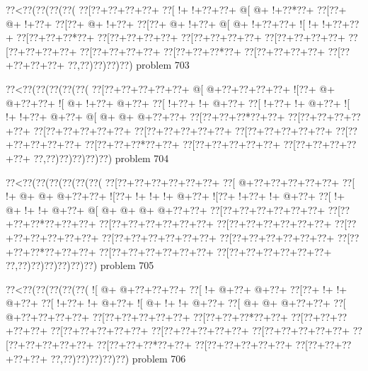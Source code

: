 \vbox{\vbox{\goo
\0??<\0??(\0??(\0??(\0??(
\0??[\0??+\0??+\0??+\0??+
\0??[\- !+\- !+\0??+\0??+
\- @[\- @+\- !+\0??*\0??+
\0??[\0??+\- @+\- !+\0??+
\0??[\0??+\- @+\- !+\0??+
\0??[\0??+\- @+\- !+\0??+
\- @[\- @+\- !+\0??+\0??+
\- ![\- !+\- !+\0??+\0??+
\0??[\0??+\0??+\0??*\0??+
\0??[\0??+\0??+\0??+\0??+
\0??[\0??+\0??+\0??+\0??+
\0??[\0??+\0??+\0??+\0??+
\0??[\0??+\0??+\0??+\0??+
\0??[\0??+\0??+\0??+\0??+
\0??[\0??+\0??+\0??*\0??+
\0??[\0??+\0??+\0??+\0??+
\0??[\0??+\0??+\0??+\0??+
\0??,\0??)\0??)\0??)\0??)
}
\hfil problem 703\hfil\break
}

\vbox{\vbox{\goo
\0??<\0??(\0??(\0??(\0??(\0??(
\0??[\0??+\0??+\0??+\0??+\0??+
\- @[\- @+\0??+\0??+\0??+\0??+
\- ![\0??+\- @+\- @+\0??+\0??+
\- ![\- @+\- !+\0??+\- @+\0??+
\0??[\- !+\0??+\- !+\- @+\0??+
\0??[\- !+\0??+\- !+\- @+\0??+
\- ![\- !+\- !+\0??+\- @+\0??+
\- @[\- @+\- @+\- @+\0??+\0??+
\0??[\0??+\0??+\0??*\0??+\0??+
\0??[\0??+\0??+\0??+\0??+\0??+
\0??[\0??+\0??+\0??+\0??+\0??+
\0??[\0??+\0??+\0??+\0??+\0??+
\0??[\0??+\0??+\0??+\0??+\0??+
\0??[\0??+\0??+\0??+\0??+\0??+
\0??[\0??+\0??+\0??*\0??+\0??+
\0??[\0??+\0??+\0??+\0??+\0??+
\0??[\0??+\0??+\0??+\0??+\0??+
\0??,\0??)\0??)\0??)\0??)\0??)
}
\hfil problem 704\hfil\break
}

\vbox{\vbox{\goo
\0??<\0??(\0??(\0??(\0??(\0??(\0??(
\0??[\0??+\0??+\0??+\0??+\0??+\0??+
\0??[\- @+\0??+\0??+\0??+\0??+\0??+
\0??[\- !+\- @+\- @+\- @+\0??+\0??+
\- ![\0??+\- !+\- !+\- !+\- @+\0??+
\- ![\0??+\- !+\0??+\- !+\- @+\0??+
\0??[\- !+\- @+\- !+\- !+\- @+\0??+
\- @[\- @+\- @+\- @+\- @+\0??+\0??+
\0??[\0??+\0??+\0??+\0??+\0??+\0??+
\0??[\0??+\0??+\0??*\0??+\0??+\0??+
\0??[\0??+\0??+\0??+\0??+\0??+\0??+
\0??[\0??+\0??+\0??+\0??+\0??+\0??+
\0??[\0??+\0??+\0??+\0??+\0??+\0??+
\0??[\0??+\0??+\0??+\0??+\0??+\0??+
\0??[\0??+\0??+\0??+\0??+\0??+\0??+
\0??[\0??+\0??+\0??*\0??+\0??+\0??+
\0??[\0??+\0??+\0??+\0??+\0??+\0??+
\0??[\0??+\0??+\0??+\0??+\0??+\0??+
\0??,\0??)\0??)\0??)\0??)\0??)\0??)
}
\hfil problem 705\hfil\break
}

\vbox{\vbox{\goo
\0??<\0??(\0??(\0??(\0??(\0??(
\- ![\- @+\- @+\0??+\0??+\0??+
\0??[\- !+\- @+\0??+\- @+\0??+
\0??[\0??+\- !+\- !+\- @+\0??+
\0??[\- !+\0??+\- !+\- @+\0??+
\- ![\- @+\- !+\- !+\- @+\0??+
\0??[\- @+\- @+\- @+\0??+\0??+
\0??[\- @+\0??+\0??+\0??+\0??+
\0??[\0??+\0??+\0??+\0??+\0??+
\0??[\0??+\0??+\0??*\0??+\0??+
\0??[\0??+\0??+\0??+\0??+\0??+
\0??[\0??+\0??+\0??+\0??+\0??+
\0??[\0??+\0??+\0??+\0??+\0??+
\0??[\0??+\0??+\0??+\0??+\0??+
\0??[\0??+\0??+\0??+\0??+\0??+
\0??[\0??+\0??+\0??*\0??+\0??+
\0??[\0??+\0??+\0??+\0??+\0??+
\0??[\0??+\0??+\0??+\0??+\0??+
\0??,\0??)\0??)\0??)\0??)\0??)
}
\hfil problem 706\hfil\break
}

